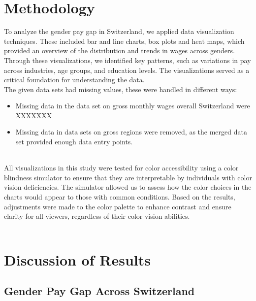 \documentclass{article}
\begin{document}
\section{Methodology}

To analyze the gender pay gap in Switzerland, we applied data visualization techniques. These included bar and line charts, box plots and heat maps, which provided an overview of the distribution and trends in wages across genders. Through these visualizations, we identified key patterns, such as variations in pay across industries, age groups, and education levels. The visualizations served as a critical foundation for understanding the data.\\

The given data sets had missing values, these were handled in different ways: 
\begin{itemize}
        \item Missing data in the data set on gross monthly wages overall Switzerland were XXXXXXX
        \item Missing data in data sets on gross regions were removed, as the merged data set provided enough data entry points. 
\end{itemize}
\\
All visualizations in this study were tested for color accessibility using a color blindness simulator to ensure that they are interpretable by individuals with color vision deficiencies. The simulator allowed us to assess how the color choices in the charts would appear to those with common conditions. Based on the results, adjustments were made to the color palette to enhance contrast and ensure clarity for all viewers, regardless of their color vision abilities.\cite{3}\\
\\
\section{Discussion of Results}

\subsection{Gender Pay Gap Across Switzerland}
\end{document}
